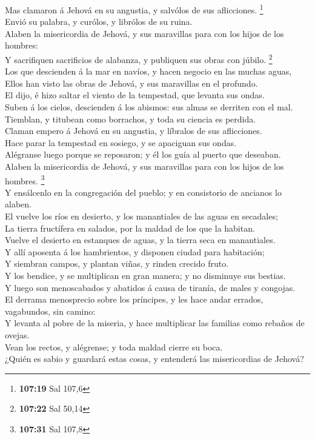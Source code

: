  Mas clamaron á Jehová en su angustia, y salvólos de sus
aflicciones. \footnote{\textbf{107:19} Sal 107,6}\\
 Envió su palabra, y curólos, y librólos de su ruina.\\
 Alaben la misericordia de Jehová, y sus maravillas para
con los hijos de los hombres:\\
 Y sacrifiquen sacrificios de alabanza, y publiquen sus
obras con júbilo. \footnote{\textbf{107:22} Sal 50,14}\\
 Los que descienden á la mar en navíos, y hacen negocio en
las muchas aguas,\\
 Ellos han visto las obras de Jehová, y sus maravillas en
el profundo.\\
 El dijo, é hizo saltar el viento de la tempestad, que
levanta sus ondas.\\
 Suben á los cielos, descienden á los abismos: sus almas se
derriten con el mal.\\
 Tiemblan, y titubean como borrachos, y toda su ciencia es
perdida.\\
 Claman empero á Jehová en su angustia, y líbralos de sus
aflicciones.\\
 Hace parar la tempestad en sosiego, y se apaciguan sus
ondas.\\
 Alégranse luego porque se reposaron; y él los guía al
puerto que deseaban.\\
 Alaben la misericordia de Jehová, y sus maravillas para
con los hijos de los hombres. \footnote{\textbf{107:31} Sal 107,8}\\
 Y ensálcenlo en la congregación del pueblo; y en
consistorio de ancianos lo alaben.\\
 El vuelve los ríos en desierto, y los manantiales de las
aguas en secadales;\\
 La tierra fructífera en salados, por la maldad de los que
la habitan.\\
 Vuelve el desierto en estanques de aguas, y la tierra seca
en manantiales.\\
 Y allí aposenta á los hambrientos, y disponen ciudad para
habitación;\\
 Y siembran campos, y plantan viñas, y rinden crecido
fruto.\\
 Y los bendice, y se multiplican en gran manera; y no
disminuye sus bestias.\\
 Y luego son menoscabados y abatidos á causa de tiranía, de
males y congojas.\\
 El derrama menosprecio sobre los príncipes, y les hace
andar errados, vagabundos, sin camino:\\
 Y levanta al pobre de la miseria, y hace multiplicar las
familias como rebaños de ovejas.\\
 Vean los rectos, y alégrense; y toda maldad cierre su
boca.\\
 ¿Quién es sabio y guardará estas cosas, y entenderá las
misericordias de Jehová?

